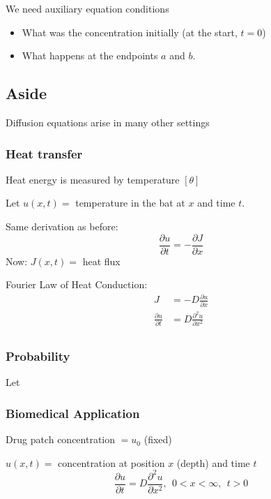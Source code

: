 \documentclass[
	date={September 4{,} 2024}
]{math486notes}
\begin{document}
We need auxiliary equation conditions

\begin{itemize}
	\item What was the concentration initially (at the start, $t=0$)
	\item What happens at the endpoints $a$ and $b$.
\end{itemize}

\subsection{Aside}\label{subsec:aside}
Diffusion equations arise in many other settings\\
\subsubsection{Heat transfer}\label{subsubsec:heat-transfer}
Heat energy is measured by temperature $[\theta]$

Let $u(x,t) = $ temperature in the bat at $x$ and time $t$.

Same derivation as before:
\[ \frac{\partial u}{\partial t} = -\frac{\partial J}{\partial x} \]
Now: $J(x,t) = $ heat flux

Fourier Law of Heat Conduction:
\begin{equation}
\begin{aligned}
	J &= -D\frac{\partial u}{\partial x}\\
	\frac{\partial u}{\partial t} &= D\frac{\partial^{2}u}{\partial x^{2}}\\
\end{aligned}
	\label{eq:fourier-heat}
\end{equation}

\subsubsection{Probability}\label{subsubsec:probability}
Let

\subsubsection{Biomedical Application}\label{subsubsec:biomedical-application}
Drug patch concentration $=u_{0}$ (fixed)

$u(x,t) = $ concentration at position $x$ (depth) and time $t$
\[ \frac{\partial u}{\partial t} = D\frac{\partial^{2}u}{\partial x^{2}},\ \ 0 < x < \infty,\ \ t > 0 \]
\end{document}
